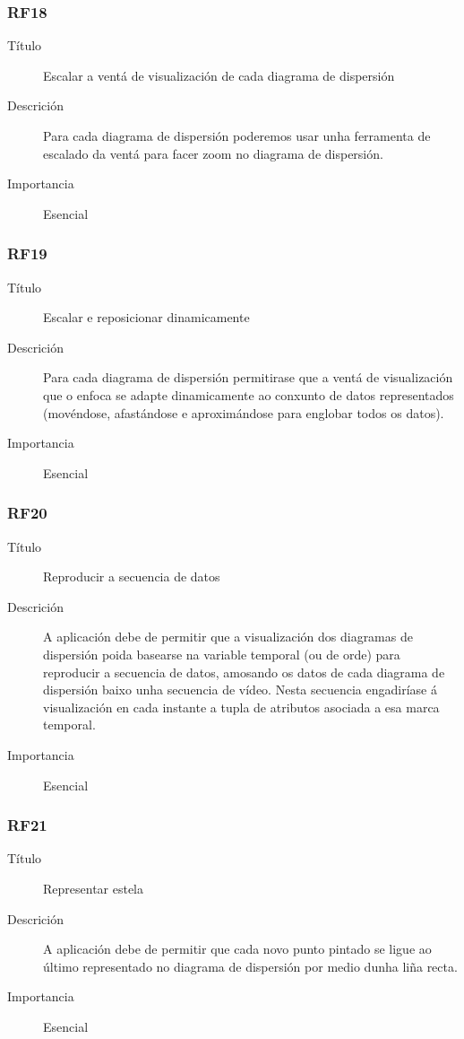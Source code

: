 \subsubsection*{RF18}
\begin{description}
\item[Título] \hfill
Escalar a ventá de visualización de cada diagrama de dispersión
\item[Descrición] \hfill
Para cada diagrama de dispersión poderemos usar unha ferramenta de escalado da ventá para facer zoom no diagrama de dispersión.
\item[Importancia] \hfill
Esencial
\end{description}

\subsubsection*{RF19}
\begin{description}
\item[Título] \hfill
Escalar e reposicionar dinamicamente
\item[Descrición] \hfill
Para cada diagrama de dispersión permitirase que a ventá de visualización que o enfoca se adapte dinamicamente ao conxunto de datos representados (movéndose, afastándose e aproximándose para englobar todos os datos).
\item[Importancia] \hfill
Esencial
\end{description}

\subsubsection*{RF20}
\begin{description}
\item[Título] \hfill
Reproducir a secuencia de datos
\item[Descrición] \hfill
A aplicación debe de permitir que a visualización dos diagramas de dispersión poida basearse na variable temporal (ou de orde) para reproducir a secuencia de datos, amosando os datos de cada diagrama de dispersión baixo unha secuencia de vídeo. Nesta secuencia engadiríase á visualización en cada instante a tupla de atributos asociada a esa marca temporal. 
\item[Importancia] \hfill
Esencial
\end{description}

\subsubsection*{RF21}
\begin{description}
\item[Título] \hfill
Representar estela
\item[Descrición] \hfill
A aplicación debe de permitir que cada novo punto pintado se ligue ao último representado no diagrama de dispersión por medio dunha liña recta.
\item[Importancia] \hfill
Esencial
\end{description}

